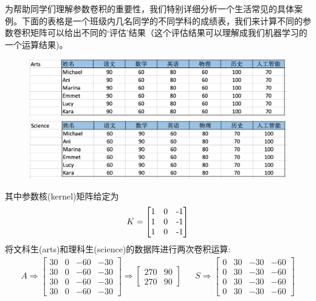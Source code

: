 \documentclass[12pt]{article}
\numberwithin{equation}{section}
\numberwithin{figure}{section}
\begin{document}
\begin{example}
为帮助同学们理解参数卷积的重要性，我们特别详细分析一个生活常见的具体案例。下面的表格是一个班级内几名同学的不同学科的成绩表，我们来计算不同的参数卷积矩阵可以给出不同的`评估'结果（这个评估结果可以理解成我们机器学习的一个运算结果)。
\begin{figure}[H]
	\centering
	\includegraphics[width=\textwidth]{fig/artsgrade}
	\includegraphics[width=\textwidth]{fig/sciencegrade}
\end{figure}
其中参数核(kernel)矩阵给定为
\begin{align*}
	K = \begin{bmatrix}
		1 & 0 & $-$1$$ \\
		1 & 0 & $-$1$$  \\
		1 & 0 & $-$1$$  
	\end{bmatrix}
\end{align*}
将文科生(arts)和理科生(science)的数据阵进行两次卷积运算:
\begin{align*}
	A \Rightarrow \begin{bmatrix}
		30 &    0  &   -60  &    -30 \\
       30  &     0  &    -60  &    -30   \\        
       30  &     0  &    -60  &   -30 \\
       30  &    0  &    -60  &   -30 
	\end{bmatrix} \Rightarrow \begin{bmatrix}
		270 & 90 \\
		270 & 90 
	\end{bmatrix} & & 	S \Rightarrow \begin{bmatrix}
	   0 & 30 & -30 & -60 \\
       0 & 30 &  -30 & -60 \\
        0 & 30 &  -30 & -60 \\
       0 & 30 &  -30 &  -60

\end{bmatrix}
\end{align*}
\end{example}
\end{document}
